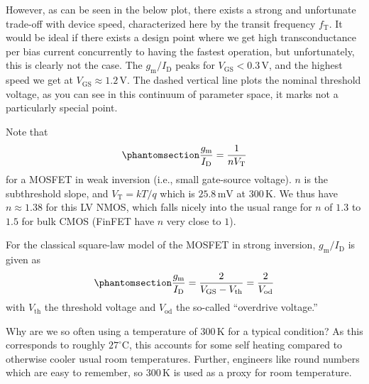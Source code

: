 \documentclass[
  a4paper,
  DIV=11,
  numbers=noendperiod]{scrartcl}
\begin{document}
However, as can be seen in the below plot, there exists a strong and
unfortunate trade-off with device speed, characterized here by the
transit frequency \(f_\mathrm{T}\). It would be ideal if there exists a
design point where we get high transconductance per bias current
concurrently to having the fastest operation, but unfortunately, this is
clearly not the case. The \(g_\mathrm{m}/I_\mathrm{D}\) peaks for
\(V_\mathrm{GS}< 0.3\,\text{V}\), and the highest speed we get at
\(V_\mathrm{GS}\approx 1.2\,\text{V}\). The dashed vertical line plots
the nominal threshold voltage, as you can see in this continuum of
parameter space, it marks not a particularly special point.

Note that
\begin{equation}\phantomsection\label{eq-mosfet-gmid-weakinversion}{
\frac{g_\mathrm{m}}{I_\mathrm{D}} = \frac{1}{n V_\mathrm{T}}
}\end{equation} for a MOSFET in weak inversion (i.e., small gate-source
voltage). \(n\) is the subthreshold slope, and
\(V_\mathrm{T} = k T / q\) which is \(25.8\,\text{mV}\) at
\(300\,\text{K}\). We thus have \(n \approx 1.38\) for this LV NMOS,
which falls nicely into the usual range for \(n\) of \(1.3\) to \(1.5\)
for bulk CMOS (FinFET have \(n\) very close to \(1\)).

For the classical square-law model of the MOSFET in strong inversion,
\(g_\mathrm{m}/I_\mathrm{D}\) is given as
\begin{equation}\phantomsection\label{eq-mosfet-gmid-stronginversion}{
\frac{g_\mathrm{m}}{I_\mathrm{D}} = \frac{2}{V_\mathrm{GS}- V_\mathrm{th}} = \frac{2}{V_\mathrm{od}} 
}\end{equation} with \(V_\mathrm{th}\) the threshold voltage and
\(V_\mathrm{od}\) the so-called ``overdrive voltage.''

\begin{tcolorbox}[enhanced jigsaw, titlerule=0mm, left=2mm, coltitle=black, toprule=.15mm, breakable, opacitybacktitle=0.6, colframe=quarto-callout-note-color-frame, bottomtitle=1mm, toptitle=1mm, opacityback=0, colbacktitle=quarto-callout-note-color!10!white, title=\textcolor{quarto-callout-note-color}{\faInfo}\hspace{0.5em}{Why 300K?}, arc=.35mm, rightrule=.15mm, colback=white, bottomrule=.15mm, leftrule=.75mm]

Why are we so often using a temperature of \(300\,\text{K}\) for a
typical condition? As this corresponds to roughly
\(27^{\circ}\text{C}\), this accounts for some self heating compared to
otherwise cooler usual room temperatures. Further, engineers like round
numbers which are easy to remember, so \(300\,\text{K}\) is used as a
proxy for room temperature.

\end{tcolorbox}
\end{document}
